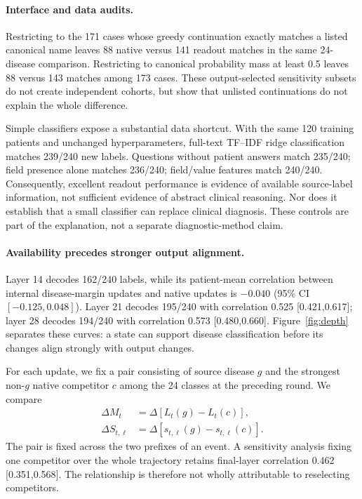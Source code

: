 \documentclass[11pt]{article}
\begin{document}
\paragraph{Interface and data audits.}
Restricting to the 171 cases whose greedy continuation exactly matches a listed canonical name leaves 88 native versus 141 readout matches in the same 24-disease comparison. Restricting to canonical probability mass at least 0.5 leaves 88 versus 143 matches among 173 cases. These output-selected sensitivity subsets do not create independent cohorts, but show that unlisted continuations do not explain the whole difference.

Simple classifiers expose a substantial data shortcut. With the same 120 training patients and unchanged hyperparameters, full-text TF--IDF ridge classification matches 239/240 new labels. Questions without patient answers match 235/240; field presence alone matches 236/240; field/value features match 240/240. Consequently, excellent readout performance is evidence of available source-label information, not sufficient evidence of abstract clinical reasoning. Nor does it establish that a small classifier can replace clinical diagnosis. These controls are part of the explanation, not a separate diagnostic-method claim.

\paragraph{Availability precedes stronger output alignment.}
Layer 14 decodes 162/240 labels, while its patient-mean correlation between internal disease-margin updates and native updates is $-0.040$ (95\% CI $[-0.125,0.048]$). Layer 21 decodes 195/240 with correlation 0.525 [0.421,0.617]; layer 28 decodes 194/240 with correlation 0.573 [0.480,0.660]. Figure~\ref{fig:depth} separates these curves: a state can support disease classification before its changes align strongly with output changes.

For each update, we fix a pair consisting of source disease $g$ and the strongest non-$g$ native competitor $c$ among the 24 classes at the preceding round. We compare
\begin{align}
 \Delta M_t&=\Delta[L_t(g)-L_t(c)],\\
 \Delta S_{t,\ell}&=\Delta[s_{t,\ell}(g)-s_{t,\ell}(c)].
\end{align}
The pair is fixed across the two prefixes of an event. A sensitivity analysis fixing one competitor over the whole trajectory retains final-layer correlation 0.462 [0.351,0.568]. The relationship is therefore not wholly attributable to reselecting competitors.
\end{document}
